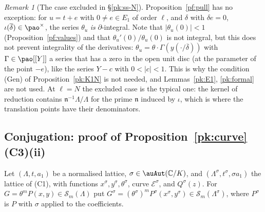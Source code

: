 \documentclass[10pt]{amsart}
\theoremstyle{definition}
\theoremstyle{remark}
\newtheorem{remark}[theorem]{Remark}
\newcommand{\C}{\mathbb C}
\providecommand{\aubar}[1]{\overline{#1}}
\begin{document}
\begin{remark}[The case excluded in \S\ref{pk:ss-N}]\label{pf:gen}
Proposition~\ref{pf:pull} has no exception: for $u=t+e$ with $0\ne e\in E_1$ of order $\ell$, and
$\delta$ with $\delta e=0$, $\iota(\aubar\delta)\in\pao^\times$, the series $\theta_u$ \emph{is}
$\partial$-integral. Note that $|\theta_u(0)|<1$ (Proposition~\ref{pf:values}) and that $\theta_u'(0)/\theta_u(0)$
is not integral, but this does not prevent integrality of the derivatives: $\theta_u=\theta\cdot
\Gamma(y(\cdot/\aubar\delta))$ with $\Gamma\in\pao[[Y]]$ a series that has a zero in the open unit
disc (at the parameter of the point $-e$), like the series $Y-c$ with $0<|c|<1$. This is why the condition
(Gen) of Proposition~\ref{pk:K1N} is not needed, and Lemmas~\ref{pk:E1}, \ref{pk:formal} are not used. At $\ell=N$ the excluded case is the typical one: the kernel of reduction contains
$\mathfrak n^{-1}\Lambda/\Lambda$ for the prime $\mathfrak n$ induced by $\iota$, which is where the
translation points have their denominators.
\end{remark}

\subsection{Conjugation: proof of Proposition~\ref{pk:curve}{\rm(C3)(ii)}}\label{pf:ss-recip}

Let $(\Lambda,t,a_1)$ be a normalised lattice, $\sigma\in\auAut(\C/K)$, and
$(\Lambda^\sigma,t^\sigma,\sigma a_1)$ the lattice of (C1), with functions $x^\sigma,y^\sigma,
\theta^\sigma$, curve $\mathcal E^\sigma$, and $Q^\sigma(z)$. For $G=\theta^mP(x,y)\in\mathcal
S_m(\Lambda)$ put $G^\sigma=(\theta^\sigma)^mP^\sigma(x^\sigma,y^\sigma)\in\mathcal S_m
(\Lambda^\sigma)$, where $P^\sigma$ is $P$ with $\sigma$ applied to the coefficients.
\end{document}
